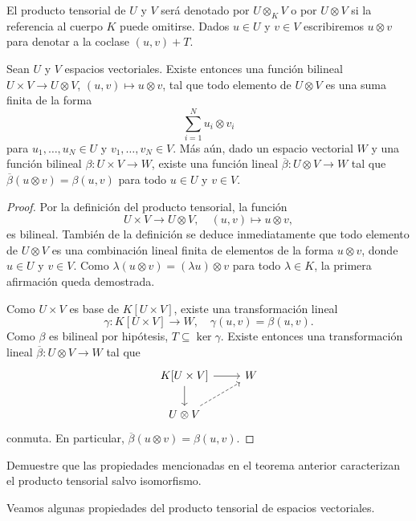 \begin{exercise}
El producto tensorial de $U$ y $V$ será denotado por $U\otimes_KV$ o por
$U\otimes V$ si la referencia al cuerpo $K$ puede omitirse. Dados $u\in U$
y $v\in V$ escribiremos $u\otimes v$ para denotar a la coclase $(u,v)+T$.

\begin{theorem}
	Sean $U$ y $V$ espacios vectoriales.  Existe entonces una función bilineal
	$U\times V\to U\otimes V$, $(u,v)\mapsto u\otimes v$, tal que todo
	elemento de $U\otimes V$ es una suma finita de la forma
	\[
		\sum_{i=1}^N u_i\otimes v_i
	\]
	para $u_1,\dots,u_N\in U$ y $v_1,\dots,v_N\in V$. 
	Más aún, dado un espacio vectorial $W$ y una función
	bilineal $\beta\colon U\times V\to W$, existe una función lineal
	$\overline{\beta}\colon U\otimes V\to W$ tal que $\overline{\beta}(u\otimes
	v)=\beta(u,v)$ para todo $u\in U$ y $v\in V$.
\end{theorem}

\begin{proof}
	Por la definición del producto tensorial, la función 
	\[
	U\times V\to U\otimes V,\quad
	(u,v)\mapsto u\otimes v,
	\]
	es bilineal. También de la definición se deduce inmediatamente que todo
	elemento de $U\otimes V$ es una combinación lineal finita de elementos de
	la forma $u\otimes v$, donde $u\in U$ y $v\in V$. Como $\lambda(u\otimes
	v)=(\lambda u)\otimes v$ para todo $\lambda\in K$, la primera afirmación
	queda demostrada.

	Como $U\times V$ es base de $K[U\times V]$, existe una transformación lineal 
	\[
		\gamma\colon K[U\times V]\to W,\quad
	\gamma(u,v)=\beta(u,v). 
	\]
	Como $\beta$ es bilineal por hipótesis, $T\subseteq\ker\gamma$. Existe
	entonces una transformación lineal $\overline{\beta}\colon U\otimes V\to
	W$ tal que 
	\[
	\begin{tikzcd}
		K[U\times V] \arrow[r]\arrow[d] & W \\
		U\otimes V\arrow[ur, dashrightarrow]
	\end{tikzcd}
	\]
	conmuta. En particular, $\overline{\beta}(u\otimes v)=\beta(u,v)$. 
\end{proof}

\begin{exercise}
	\label{xca:tensorial_unicidad}
	Demuestre que las propiedades mencionadas en el teorema anterior
	caracterizan el producto tensorial salvo isomorfismo.
\end{exercise}

Veamos algunas propiedades del producto tensorial de espacios vectoriales. 


\end{exercise}
